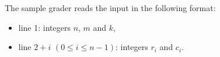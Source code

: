 The sample grader reads the input in the following format:

\begin{itemize}
\item line 1: integers $n$, $m$ and $k$,
\item line $2 + i$ $(0 \le i \le n - 1)$: integers $r_i$ and $c_i$.
\end{itemize}